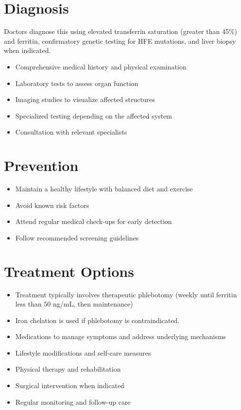 \section{Diagnosis}
Doctors diagnose this using elevated transferrin saturation (greater than 45\%) and ferritin, confirmatory genetic testing for HFE mutations, and liver biopsy when indicated.

\begin{itemize}[noitemsep]
  \item Comprehensive medical history and physical examination
  \item Laboratory tests to assess organ function
  \item Imaging studies to visualize affected structures
  \item Specialized testing depending on the affected system
  \item Consultation with relevant specialists
\end{itemize}
\section{Prevention}
\begin{itemize}[noitemsep]
  \item Maintain a healthy lifestyle with balanced diet and exercise
  \item Avoid known risk factors
  \item Attend regular medical check-ups for early detection
  \item Follow recommended screening guidelines
\end{itemize}
\section{Treatment Options}
\begin{itemize}[noitemsep]
  \item Treatment typically involves therapeutic phlebotomy (weekly until ferritin less than 50 ng/mL, then maintenance)
  \item Iron chelation is used if phlebotomy is contraindicated.
  \item Medications to manage symptoms and address underlying mechanisms
  \item Lifestyle modifications and self-care measures
  \item Physical therapy and rehabilitation
  \item Surgical intervention when indicated
  \item Regular monitoring and follow-up care
\end{itemize}
